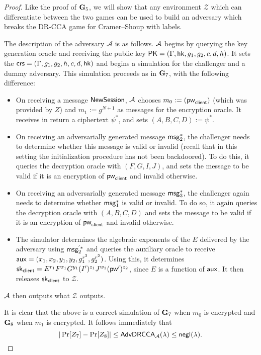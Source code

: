 \begin{proof}
	Like the proof of $\mathbf{G}_5$, we will show that any environment $\mathcal{Z}$ which can differentiate between the two games can be used to build an adversary which breaks the DR-CCA game for Cramer--Shoup with labels.
	
	The description of the adversary $\mathcal{A}$ is as follows. $\mathcal{A}$ begins by querying the key generation oracle and receiving the public key $\mathsf{PK} = (\Gamma,\mathsf{hk},g_1,g_2,c,d,h)$. It sets the $\mathsf{crs} = (\Gamma,g_1,g_2,h,c,d,\mathsf{hk})$ and begins a simulation for the challenger and a dummy adversary. This simulation proceeds as in $\mathbf{G}_7$, with the following difference:
	
	\begin{itemize}
		\item On receiving a message $\mathsf{NewSession}$, $\mathcal{A}$ chooses $m_0:=(\mathsf{pw}_{\mathsf{client}})$ (which was provided by $Z$) and $m_1:=g^{N+1}$ as messages for the encryption oracle. It receives in return a ciphertext $\psi^{*}$, and sets $(A,B,C,D):=\psi^{*}$.
		\item On receiving an adversarially generated message $\mathsf{msg}_{2}^{*}$, the challenger needs to determine whether this message is valid or invalid (recall that in this setting the initialization procedure has not been backdoored). To do this, it queries the decryption oracle with $(F,G,I,J)$, and sets the message to be valid if it is an encryption of $\mathsf{pw}_{\mathsf{client}}$ and invalid otherwise.
		\item On receiving an adversarially generated message $\mathsf{msg}_{3}^{*}$, the challenger again needs to determine whether $\mathsf{msg}_{1}^{*}$ is valid or invalid. To do so, it again queries the decryption oracle with $(A,B,C,D)$ and sets the message to be valid if it is an encryption of $\mathsf{pw}_{\mathsf{client}}$ and invalid otherwise.
		\item The simulator determines the algebraic exponents of the $E$ delivered by the adversary using $\mathsf{msg}_{2}^{'*}$ and queries the auxiliary oracle to receive $\mathsf{aux} = (x_1,x_2,y_1,y_2,g_1^{r^2},g_2^{r^2})$. Using this, it determines $\mathsf{sk}_{\mathsf{client}} = E^{r_1}F^{x_1}G^{y_1}(I')^{z_1}J^{w_1}(\mathsf{pw}')^{z_2}$, since $E$ is a function of $\mathsf{aux}$. It then releases $\mathsf{sk}_{\mathsf{client}}$ to $\mathcal{Z}$.
	\end{itemize}
	$\mathcal{A}$ then outputs what $\mathcal{Z}$ outputs.
	
	It is clear that the above is a correct simulation of $\mathbf{G}_7$ when $m_0$ is encrypted and $\mathbf{G}_8$ when $m_1$ is encrypted. It follows immediately that $$|\Pr[Z_7]-\Pr[Z_8]|\leq\mathsf{AdvDRCCA}_{\mathcal{A}}(\lambda)\leq\mathsf{negl}(\lambda).$$
\end{proof}

